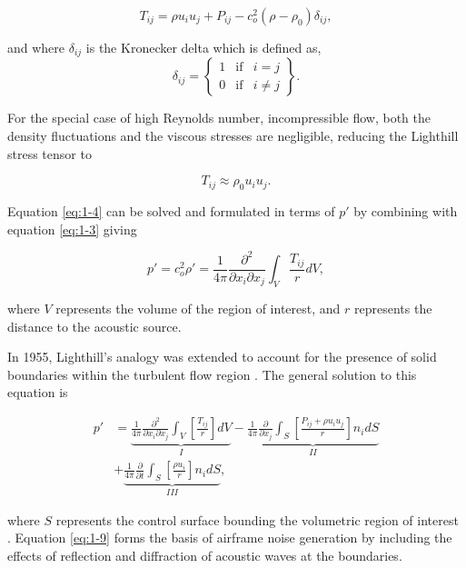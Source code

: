 \begin{equation}
T_{ij} = \rho u_i u_j + P_{ij} - c_o^2(\rho - \rho_0) \delta_{ij},
\end{equation}

and where $\delta_{ij}$ is the Kronecker delta which is defined as,
\begin{equation}
\delta_{ij} = \left\{
\begin{array}{lcr}
1 & \mbox{if} & i = j \\
0 & \mbox{if} & i \neq j
\end{array}
\right\}.
\end{equation}

For the special case of high Reynolds number, incompressible flow, both the density fluctuations and the viscous stresses are negligible, reducing the Lighthill stress tensor to

\begin{equation}
T_{ij} \approx \rho_0 u_i u_j.
\end{equation}

Equation \ref{eq:1-4} can be solved and formulated in terms of $p'$ by combining with equation \ref{eq:1-3} giving

\begin{equation}
p' = c_o^2 \rho' = \frac{1}{4\pi} \frac{\partial^2}{\partial x_i \partial x_j} \int_{V} \frac{T_{ij}}{r}dV,
\end{equation}

where $V$ represents the volume of the region of interest, and $r$ represents the distance to the acoustic source.

In 1955, Lighthill's analogy was extended to account for the presence of solid boundaries within the turbulent flow region \cite{curle1955}.  The general solution to this equation is 

\begin{equation} \label{eq:1-9}
\begin{aligned}
p' &= \underbrace{ \frac{1}{4\pi} \frac{\partial^2}{\partial x_i \partial x_j} \int_V \left[ \frac{T_{ij}}{r} \right] dV }_I - \underbrace{ \frac{1}{4\pi} \frac{\partial}{\partial x_j} \int_S \left[ \frac{P_{ij} + \rho u_i u_j}{r} \right] n_i dS }_{II} \\
&+ \underbrace{ \frac{1}{4\pi} \frac{\partial}{\partial t} \int_S \left[ \frac{\rho u_i}{r} \right] n_i dS}_{III},
\end{aligned}
\end{equation}

where $S$ represents the control surface bounding the volumetric region of interest \cite{hirschberg2004}. Equation \ref{eq:1-9} forms the basis of airframe noise generation by including the effects of reflection and diffraction of acoustic waves at the boundaries.

